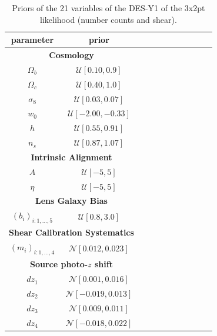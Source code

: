 \documentclass[twocolumn,twocolappendix,nofootinbib]{openjournal}
\begin{document}
\begin{table}[htb]
\caption{Priors of the 21 variables of the DES-Y1 of the 3x2pt likelihood (number counts and shear).}
\label{tab-DESY1}
 \centering
\begin{tabular}{ccccccccccc}
\hline
 parameter &  prior \\
 \hline
  \multicolumn{2}{c}{\textbf{Cosmology}} \\
$\Omega_b$ & $\mathcal{U}[0.10, 0.9]$ \\
$\Omega_c$ & $\mathcal{U}[0.40, 1.0]$ \\
$\sigma_8$ & $\mathcal{U}[0.03, 0.07]$ \\
$w_0$ & $\mathcal{U}[-2.00, -0.33]$ \\
$h$ & $\mathcal{U}[0.55, 0.91]$ \\
$n_s$ & $\mathcal{U}[0.87, 1.07]$ \\
\multicolumn{2}{c}{\textbf{Intrinsic Alignment}} \\
$A$ & $\mathcal{U}[-5,5]$ \\
$\eta$ &$\mathcal{U}[-5,5]$ \\
\multicolumn{2}{c}{\textbf{Lens Galaxy Bias}} \\
$(b_i)_{i:1,\dots,5}$ & $\mathcal{U}[0.8,3.0]$ \\
\multicolumn{2}{c}{\textbf{Shear Calibration Systematics}} \\
$(m_i)_{i:1,\dots,4}$ & $\mathcal{N}[0.012,0.023]$ \\
\multicolumn{2}{c}{\textbf{Source photo-$z$ shift}} \\
$dz_1$ & $\mathcal{N}[0.001,0.016]$ \\
$dz_2$ & $\mathcal{N}[-0.019,0.013]$ \\
$dz_3$ & $\mathcal{N}[0.009,0.011]$ \\
$dz_4$ & $\mathcal{N}[-0.018,0.022]$ \\
\hline
\end{tabular}
\end{table}
\end{document}
